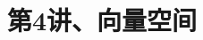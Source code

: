\documentclass[10pt,a4paper%
tablecaptionabove]{article}
\begin{document}
\begin{CJK}{UTF8}{gkai}
  \pagestyle{plain}
  
  \renewcommand{\proofname}{\textbf{证明}}
  \renewcommand{\figurename}{\textbf{图}}

  

  \title{第4讲、向量空间}
  \maketitle

  
  
  
  
  
  


\end{CJK}
\end{document}
